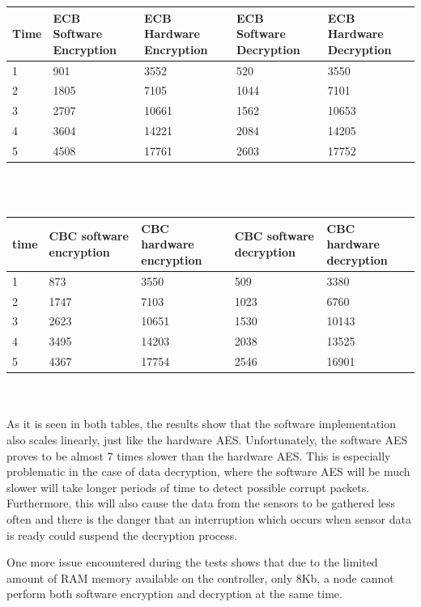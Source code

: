 \begin{tabular}{ | l | p{1.5cm} | p{1.5cm} | p{1.5cm} | p{1.5cm} |}
    \hline
    Time & ECB Software Encryption & ECB Hardware Encryption & ECB Software Decryption & ECB Hardware Decryption \\ \hline
    1 & 901 & 3552 & 520 & 3550 \\ \hline
    2 & 1805 & 7105 & 1044 & 7101 \\ \hline
    3 & 2707 & 10661 & 1562 & 10653\\ \hline
    4 & 3604 & 14221 & 2084 & 14205\\ \hline
    5 & 4508 & 17761 & 2603 & 17752\\ \hline
\end{tabular}\\\\

\begin{tabular}{ | l | p{1.5cm} | p{1.5cm} | p{1.5cm} | p{1.5cm} |}
    \hline
    time & CBC software encryption & CBC hardware encryption & CBC software decryption & CBC hardware decryption \\ \hline
    1 & 873 & 3550 & 509 & 3380 \\ \hline
    2 & 1747 & 7103 & 1023 & 6760 \\ \hline
    3 & 2623 & 10651 & 1530 & 10143 \\ \hline
    4 & 3495 & 14203 & 2038 & 13525 \\ \hline
    5 & 4367 & 17754 & 2546 & 16901\\ \hline
\end{tabular}\\\\

As it is seen in both tables, the results show that the software implementation also 
scales linearly, just like the hardware AES. Unfortunately, the software AES proves to 
be almost 7 times slower than the hardware AES. This is especially problematic in the 
case of data decryption, where the software AES will be much slower will take longer 
periods of time to detect possible corrupt packets. Furthermore, this will also cause 
the data from the sensors to be gathered less often and there is the danger that 
an interruption which occurs when sensor data is ready could suspend the decryption 
process.

One more issue encountered during the tests shows that due to the limited amount of 
RAM memory available on the controller, only 8Kb, a node cannot perform both software 
encryption and decryption at the same time.

